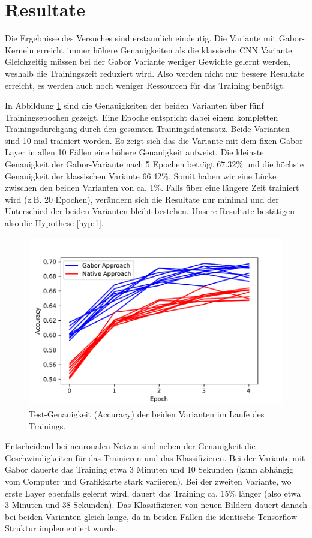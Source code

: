 \section{Resultate}

Die Ergebnisse des Versuches sind erstaunlich eindeutig.
Die Variante mit Gabor-Kerneln erreicht immer höhere Genauigkeiten als die klassische CNN Variante.
Gleichzeitig müssen bei der Gabor Variante weniger Gewichte gelernt werden, weshalb die Trainingszeit reduziert wird.
Also werden nicht nur bessere Resultate erreicht, es werden auch noch weniger Ressourcen für das Training benötigt.

In Abbildung \ref{fig:acc} sind die Genauigkeiten der beiden Varianten über fünf Trainingsepochen gezeigt.
Eine Epoche entspricht dabei einem kompletten Trainingsdurchgang durch den gesamten Trainingsdatensatz.
Beide Varianten sind 10 mal trainiert worden. 
Es zeigt sich das die Variante mit dem fixen Gabor-Layer in allen 10 Fällen eine höhere Genauigkeit aufweist.
Die kleinste Genauigkeit der Gabor-Variante nach 5 Epochen beträgt 67.32\% und die höchste Genauigkeit der klassischen Variante 66.42\%.
Somit haben wir eine Lücke zwischen den beiden Varianten von ca. 1\%.
Falls über eine längere Zeit trainiert wird (z.B. 20 Epochen), verändern sich die Resultate nur minimal und der Unterschied der beiden Varianten bleibt bestehen.
Unsere Resultate bestätigen also die Hypothese \ref{hyp:1}.

\begin{figure}
	\centering
	\includegraphics[width=0.7\linewidth]{./papers/visuell/images/accuracy}
	\caption{Test-Genauigkeit (Accuracy) der beiden Varianten im Laufe des Trainings.}
	\label{fig:acc}
\end{figure}

Entscheidend bei neuronalen Netzen sind neben der Genauigkeit die Geschwindigkeiten für das Trainieren und das Klassifizieren.
Bei der Variante mit Gabor dauerte das Training etwa 3 Minuten und 10 Sekunden (kann abhängig vom Computer und Grafikkarte stark variieren).
Bei der zweiten Variante, wo erste Layer ebenfalls gelernt wird, dauert das Training ca. 15\% länger (also etwa 3 Minuten und 38 Sekunden).
Das Klassifizieren von neuen Bildern dauert danach bei beiden Varianten gleich lange, da in beiden Fällen die identische Tensorflow-Struktur implementiert wurde.